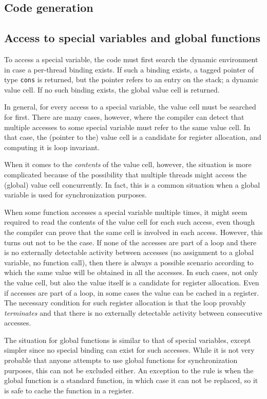 \subsection{Code generation}

\subsection{Access to special variables and global functions}

To access a special variable, the code must first search the dynamic
environment in case a per-thread binding exists.  If such a binding
exists, a tagged pointer of type \texttt{cons} is returned, but the
pointer refers to an entry on the stack; a dynamic value cell.  If no
such binding exists, the global value cell is returned.

In general, for every access to a special variable, the value cell
must be searched for first.  There are many cases, however, where the
compiler can detect that multiple accesses to some special variable
must refer to the same value cell.  In that case, the (pointer to the)
value cell is a candidate for register allocation, and computing it is
loop invariant.

When it comes to the \emph{contents} of the value cell, however, the
situation is more complicated because of the possibility that multiple
threads might access the (global) value cell concurrently.  In fact,
this is a common situation when a global variable is used for
synchronization purposes.

When some function accesses a special variable multiple times, it
might seem required to read the contents of the value cell for each
such access, even though the compiler can prove that the same cell is
involved in each access.  However, this turns out not to be the case.
If none of the accesses are part of a loop and there is no externally
detectable activity between accesses (no assignment to a global
variable, no function call), then there is always a possible scenario
according to which the same value will be obtained in all the
accesses.  In such cases, not only the value cell, but also the value
itself is a candidate for register allocation.  Even if accesses are
part of a loop, in some cases the value can be cached in a register.
The necessary condition for such register allocation is that the loop
provably \emph{terminates} and that there is no externally detectable
activity between consecutive accesses.

The situation for global functions is similar to that of special
variables, except simpler since no special binding can exist for such
accesses.  While it is not very probable that anyone attempts to use
global functions for synchronization purposes, this can not be
excluded either.  An exception to the rule is when the global function
is a standard \commonlisp{} function, in which case it can not be replaced, so
it is safe to cache the function in a register.

